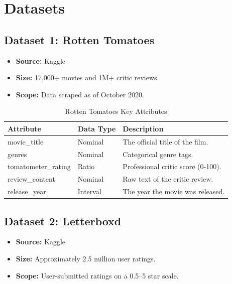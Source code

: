 \documentclass[conference]{IEEEtran}
\begin{document}
\section{Datasets}

\subsection{Dataset 1: Rotten Tomatoes}
\begin{itemize}
  \item \textbf{Source:} Kaggle \cite{leone2020rotten}
  \item \textbf{Size:} 17,000+ movies and 1M+ critic reviews.
  \item \textbf{Scope:} Data scraped as of October 2020.
\end{itemize}

\begin{table}[htbp]
  \centering
  \caption{Rotten Tomatoes Key Attributes}
  \label{table:rotten_tomatoes}
  \begin{tabularx}{\columnwidth}{|l|l|X|}
    \hline
    \textbf{Attribute}  & \textbf{Data Type} & \textbf{Description}               \\ \hline
    movie\_title        & Nominal            & The official title of the film.    \\ \hline
    genres              & Nominal            & Categorical genre tags.            \\ \hline
    tomatometer\_rating & Ratio              & Professional critic score (0-100). \\ \hline
    review\_content     & Nominal            & Raw text of the critic review.     \\ \hline
    release\_year       & Interval           & The year the movie was released.   \\ \hline
  \end{tabularx}
\end{table}

\subsection{Dataset 2: Letterboxd}
\begin{itemize}
  \item \textbf{Source:} Kaggle \cite{letterboxd2020}
  \item \textbf{Size:} Approximately 2.5 million user ratings.
  \item \textbf{Scope:} User-submitted ratings on a 0.5--5 star scale.
\end{itemize}
\end{document}
